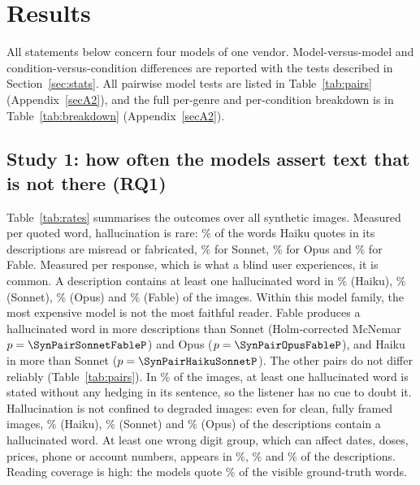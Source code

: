 \section{Results}\label{sec:results}

All statements below concern four models of one vendor. Model-versus-model and condition-versus-condition differences are reported with the tests described in Section~\ref{sec:stats}. All pairwise model tests are listed in Table~\ref{tab:pairs} (Appendix~\ref{secA2}), and the full per-genre and per-condition breakdown is in Table~\ref{tab:breakdown} (Appendix~\ref{secA2}).

\subsection{Study 1: how often the models assert text that is not there (RQ1)}\label{sec:rq1}

Table~\ref{tab:rates} summarises the outcomes over all \NImages{} synthetic images. Measured per quoted word, hallucination is rare: \HallPHaikuDesc\% of the words Haiku quotes in its descriptions are misread or fabricated, \HallPSonnetDesc\% for Sonnet, \HallPOpusDesc\% for Opus and \HallPFableDesc\% for Fable. Measured per response, which is what a blind user experiences, it is common. A description contains at least one hallucinated word in \ImgPHaikuDesc\% (Haiku), \ImgPSonnetDesc\% (Sonnet), \ImgPOpusDesc\% (Opus) and \ImgPFableDesc\% (Fable) of the images. Within this model family, the most expensive model is not the most faithful reader. Fable produces a hallucinated word in more descriptions than Sonnet (Holm-corrected McNemar $p=\SynPairSonnetFableP$) and Opus ($p=\SynPairOpusFableP$), and Haiku in more than Sonnet ($p=\SynPairHaikuSonnetP$). The other pairs do not differ reliably (Table~\ref{tab:pairs}). In \RangeImgUnh\% of the images, at least one hallucinated word is stated without any hedging in its sentence, so the listener has no cue to doubt it. Hallucination is not confined to degraded images: even for clean, fully framed images, \ImgCleanFullHaiku\% (Haiku), \ImgCleanFullSonnet\% (Sonnet) and \ImgCleanFullOpus\% (Opus) of the descriptions contain a hallucinated word. At least one wrong digit group, which can affect dates, doses, prices, phone or account numbers, appears in \ImgDigitHaiku\%, \ImgDigitSonnet\% and \ImgDigitOpus\% of the descriptions. Reading coverage is high: the models quote \RangeCov\% of the visible ground-truth words.

